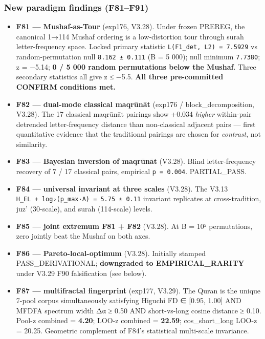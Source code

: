 \documentclass[
]{article}
\providecommand{\tightlist}{%
  \setlength{\itemsep}{0pt}\setlength{\parskip}{0pt}}
\begin{document}
\subsubsection{New paradigm findings
(F81--F91)}\label{new-paradigm-findings-f81f91}

\begin{itemize}
\tightlist
\item
  \textbf{F81 --- Mushaf-as-Tour} (exp176, V3.28). Under frozen PREREG,
  the canonical 1→114 Mushaf ordering is a low-distortion tour through
  surah letter-frequency space. Locked primary statistic
  \texttt{L(F1\_det,\ L2)\ =\ 7.5929} vs random-permutation null
  \texttt{8.162\ ±\ 0.111} (B = 5 000); null minimum \texttt{7.7380}; z
  = −5.14; \textbf{0 / 5 000 random permutations below the Mushaf}.
  Three secondary statistics all give z ≤ −5.5. \textbf{All three
  pre-committed CONFIRM conditions met.}
\item
  \textbf{F82 --- dual-mode classical maqrūnāt} (exp176 /
  block\_decomposition, V3.28). The 17 classical maqrūnāt pairings show
  +0.034 \emph{higher} within-pair detrended letter-frequency distance
  than non-classical adjacent pairs --- first quantitative evidence that
  the traditional pairings are chosen for \emph{contrast}, not
  similarity.
\item
  \textbf{F83 --- Bayesian inversion of maqrūnāt} (V3.28). Blind
  letter-frequency recovery of 7 / 17 classical pairs, empirical
  \texttt{p\ =\ 0.004}. PARTIAL\_PASS.
\item
  \textbf{F84 --- universal invariant at three scales} (V3.28). The
  V3.13 \texttt{H\_EL\ +\ log₂(p\_max·A)\ =\ 5.75\ ±\ 0.11} invariant
  replicates at cross-tradition, juz' (30-scale), and surah (114-scale)
  levels.
\item
  \textbf{F85 --- joint extremum F81 + F82} (V3.28). At B = 10⁵
  permutations, zero jointly beat the Mushaf on both axes.
\item
  \textbf{F86 --- Pareto-local-optimum} (V3.28). Initially stamped
  PASS\_DERIVATIONAL; \textbf{downgraded to EMPIRICAL\_RARITY} under
  V3.29 F90 falsification (see below).
\item
  \textbf{F87 --- multifractal fingerprint} (exp177, V3.29). The Quran
  is the unique 7-pool corpus simultaneously satisfying Higuchi FD ∈
  {[}0.95, 1.00{]} AND MFDFA spectrum width Δα ≥ 0.50 AND short-vs-long
  cosine distance ≥ 0.10. Pool-z combined = \textbf{4.20}; LOO-z
  combined = \textbf{22.59}; cos\_short\_long LOO-z = 20.25. Geometric
  complement of F84's statistical multi-scale invariance.

\end{itemize}
\end{document}

